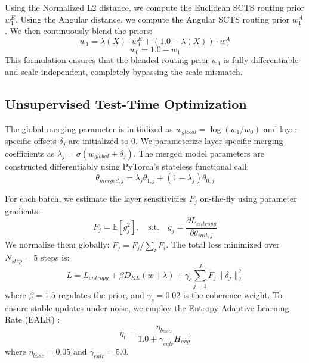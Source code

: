 \documentclass{article}
\theoremstyle{plain}
\theoremstyle{definition}
\theoremstyle{remark}
\begin{document}
Using the Normalized L2 distance, we compute the Euclidean SCTS routing prior $w^E_1$. Using the Angular distance, we compute the Angular SCTS routing prior $w^A_1$. We then continuously blend the priors:
\begin{equation}
    w_1 = \lambda(X) \cdot w^E_1 + (1.0 - \lambda(X)) \cdot w^A_1
\end{equation}
\begin{equation}
    w_0 = 1.0 - w_1
\end{equation}
This formulation ensures that the blended routing prior $w_1$ is fully differentiable and scale-independent, completely bypassing the scale mismatch.

\subsection{Unsupervised Test-Time Optimization}

The global merging parameter is initialized as $w_{global} = \log(w_1 / w_0)$ and layer-specific offsets $\delta_j$ are initialized to 0. We parameterize layer-specific merging coefficients as $\lambda_j = \sigma(w_{global} + \delta_j)$. The merged model parameters are constructed differentiably using PyTorch's stateless functional call:
\begin{equation}
    \theta_{merged, j} = \lambda_j \theta_{1, j} + (1 - \lambda_j) \theta_{0, j}
\end{equation}

For each batch, we estimate the layer sensitivities $F_j$ on-the-fly using parameter gradients:
\begin{equation}
    F_j = \mathbb{E}[g_j^2], \quad \text{s.t.} \quad g_j = \frac{\partial L_{entropy}}{\partial \theta_{init, j}}
\end{equation}
We normalize them globally: $\tilde{F}_j = F_j / \sum_i F_i$. The total loss minimized over $N_{step}=5$ steps is:
\begin{equation}
    L = L_{entropy} + \beta D_{KL}(w \| \lambda) + \gamma_c \sum_{j=1}^J \tilde{F}_j \|\delta_j\|_2^2
\end{equation}
where $\beta = 1.5$ regulates the prior, and $\gamma_c = 0.02$ is the coherence weight. To ensure stable updates under noise, we employ the Entropy-Adaptive Learning Rate (EALR) \cite{anonymous}:
\begin{equation}
    \eta_t = \frac{\eta_{base}}{1.0 + \gamma_{ealr} H_{avg}}
\end{equation}
where $\eta_{base}=0.05$ and $\gamma_{ealr}=5.0$.
\end{document}
